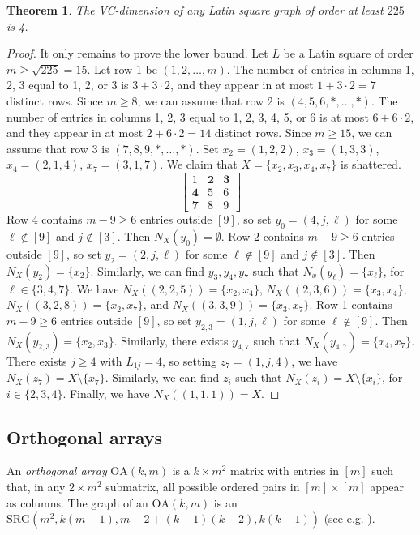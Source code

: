 \documentclass{article}
\newcommand\sm{\setminus}
\newtheorem{thm}{Theorem}
\theoremstyle{definition}
\begin{document}
\begin{thm} \label{Theorem Latin square} The VC-dimension of any Latin square graph of order at least $225$ is 4.
\end{thm}
\begin{proof}
    It only remains to prove the lower bound. Let $L$ be a Latin square of order $m\ge\sqrt{225}=15$. Let row 1 be $(1,2,\ldots,m)$. The number of entries in columns 1, 2, 3 equal to 1, 2, or 3 is $3+3\cdot 2$, and they appear in at most $1+3\cdot 2=7$ distinct rows. Since $m\ge 8$, we can assume that row 2 is $(4,5,6,*,\ldots,*)$. The number of entries in columns 1, 2, 3 equal to 1, 2, 3, 4, 5, or 6 is at most $6+6\cdot 2$, and they appear in at most $2+6\cdot 2=14$ distinct rows. Since $m\ge 15$, we can assume that row 3 is $(7,8,9,*,\ldots,*)$. Set $x_2=(1,2,2)$, $x_3=(1,3,3)$, $x_4=(2,1,4)$, $x_7=(3,1,7)$. We claim that $X=\{x_2,x_3,x_4,x_7\}$ is shattered. 
    $$\begin{bmatrix}
    1&\mathbf{2}&\mathbf{3}\\
    \mathbf{4}&5&6\\
    \mathbf{7}&8&9
\end{bmatrix}$$
    Row 4 contains $m-9\ge 6$ entries outside $[9]$, so set $y_0=(4,j,\ell)$ for some $\ell\not\in[9]$ and $j\not\in[3]$. Then $N_X(y_0)=\emptyset$. Row 2 contains $m-9\ge 6$ entries outside $[9]$, so set $y_2=(2,j,\ell)$ for some $\ell\not\in[9]$ and $j\not\in[3]$. Then $N_X(y_2)=\{x_2\}$. Similarly, we can find $y_3,y_4,y_7$ such that $N_x(y_\ell)=\{x_\ell\}$, for $\ell\in\{3,4,7\}$. We have $N_X((2,2,5))=\{x_2,x_4\}$, $N_X((2,3,6))=\{x_3,x_4\}$, $N_X((3,2,8))=\{x_2,x_7\}$, and $N_X((3,3,9))=\{x_3,x_7\}$. Row 1 contains $m-9\ge 6$ entries outside $[9]$, so set $y_{2,3}=(1,j,\ell)$ for some $\ell\not\in[9]$. Then $N_X(y_{2,3})=\{x_2,x_3\}$. Similarly, there exists $y_{4,7}$ such that $N_X(y_{4,7})=\{x_4,x_7\}$. There exists $j\ge 4$ with $L_{1j}=4$, so setting $z_7=(1,j,4)$, we have $N_X(z_7)=X\sm\{x_7\}$. Similarly, we can find $z_i$ such that $N_X(z_i)=X\sm\{x_i\}$, for $i\in\{2,3,4\}$. Finally, we have $N_X((1,1,1))=X$.
\end{proof}

\subsection{Orthogonal arrays}

An \textit{orthogonal array} $\mathrm{OA}(k,m)$ is a $k\times m^2$ matrix with entries in $[m]$ such that, in any $2\times m^2$ submatrix, all possible ordered pairs in $[m]\times[m]$ appear as columns. The graph of an $\mathrm{OA}(k,m)$ is an $\mathrm{SRG}(m^2,k(m-1),m-2+(k-1)(k-2),k(k-1))$ (see e.g. \cite{godsil2013algebraic}).
\end{document}
